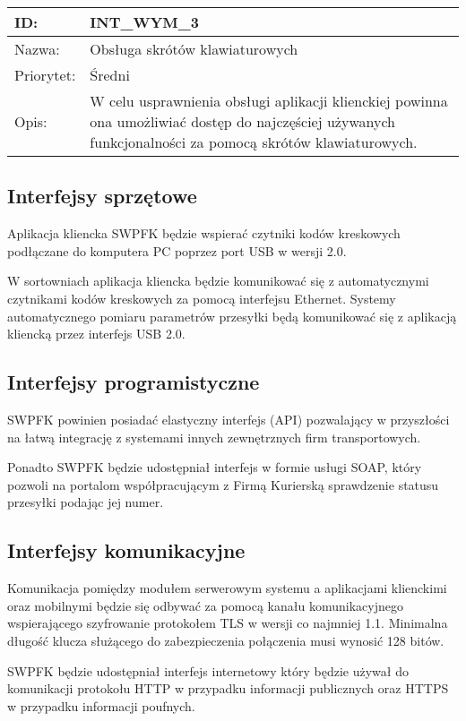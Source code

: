 \begin{center}
\begin{tabular}[h]{|p{1.6cm}|p{13.5cm}|}
\hline
ID: & INT\_WYM\_3 \\ \hline
Nazwa: & Obsługa skrótów klawiaturowych \\ \hline
Priorytet: & Średni \\ \hline
Opis: & W celu usprawnienia obsługi aplikacji klienckiej powinna ona umożliwiać dostęp do najczęściej używanych funkcjonalności za pomocą skrótów klawiaturowych. \\
\hline
\end{tabular}
\end{center}


\subsection{Interfejsy sprzętowe}
Aplikacja kliencka SWPFK będzie wspierać czytniki kodów kreskowych podłączane do komputera PC poprzez port USB w wersji 2.0.

W sortowniach aplikacja kliencka będzie komunikować się z automatycznymi czytnikami kodów kreskowych za pomocą interfejsu Ethernet. Systemy automatycznego pomiaru parametrów przesyłki będą komunikować się z aplikacją kliencką przez interfejs USB 2.0.

\subsection{Interfejsy programistyczne}
SWPFK powinien posiadać elastyczny interfejs (API) pozwalający w przyszłości na łatwą integrację z systemami innych zewnętrznych firm transportowych.

Ponadto SWPFK będzie udostępniał interfejs w formie usługi SOAP, który pozwoli na portalom współpracującym z Firmą Kurierską sprawdzenie statusu przesyłki podając jej numer.

\subsection{Interfejsy komunikacyjne}
Komunikacja pomiędzy modułem serwerowym systemu a aplikacjami klienckimi oraz mobilnymi będzie się odbywać za pomocą kanału komunikacyjnego wspierającego szyfrowanie protokołem TLS w wersji co najmniej 1.1. Minimalna długość klucza służącego do zabezpieczenia połączenia musi wynosić 128 bitów.

SWPFK będzie udostępniał interfejs internetowy który będzie używał do komunikacji protokołu HTTP w przypadku informacji publicznych oraz HTTPS w przypadku informacji poufnych.